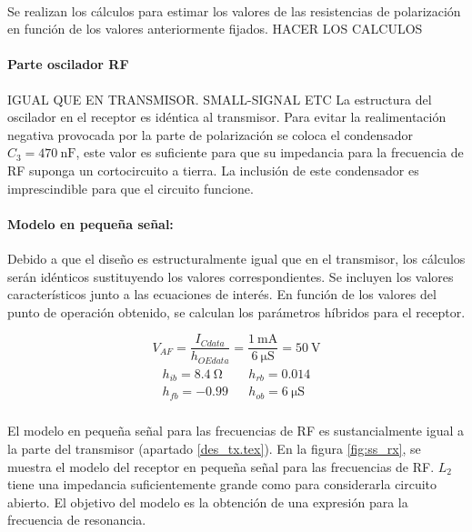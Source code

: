 \paragraph{}
Se realizan los cálculos para estimar los valores de las resistencias de polarización en función de los valores anteriormente fijados.
HACER LOS CALCULOS

\paragraph{Parte oscilador RF} IGUAL QUE EN TRANSMISOR. SMALL-SIGNAL ETC 
La estructura del oscilador en el receptor es idéntica al transmisor. Para evitar la realimentación negativa provocada por la parte de polarización se coloca el condensador $C_3 = \SI{470}{\nano\farad}$, este valor es suficiente para que su impedancia para la frecuencia de RF suponga un cortocircuito a tierra. La inclusión de este condensador es imprescindible para que el circuito funcione. 
\paragraph{Modelo en pequeña señal:} Debido a que el diseño es estructuralmente igual que en el transmisor, los cálculos serán idénticos sustituyendo los valores correspondientes.
Se incluyen los valores característicos junto a las ecuaciones de interés.
En función de los valores del punto de operación obtenido, se calculan los parámetros híbridos para el receptor.

\begin{equation}
   \label{eq:result_pol1}
V_{AF} = \frac{I_{Cdata}}{h_{OEdata}} =\frac{\SI{1}{\milli\ampere}}{\SI{6}{\micro\siemens}} =  \SI{50}{\volt} 
\end{equation}
\begin{equation}
   \label{eq:result_pol2}
\begin{array}{rl} 
      \begin{array}{l}
	 h_{ib} =  \SI{8.4}{\ohm} \\
	 h_{fb} =  -0.99
      \end{array}
      &
      \begin{array}{l}
	 h_{rb} =  0.014 \\
	 h_{ob} =  \SI{6}{\micro\siemens}
      \end{array}
\end{array}
\end{equation}

\paragraph{}
El modelo en pequeña señal para las frecuencias de RF es sustancialmente igual a la parte del transmisor (apartado \ref{des_tx.tex}). En la figura \ref{fig:ss_rx}, se muestra el modelo del receptor en pequeña señal para las frecuencias de RF. $L_2$ tiene una impedancia suficientemente grande como para considerarla circuito abierto. El objetivo del modelo es la obtención de una expresión para la frecuencia de resonancia.

